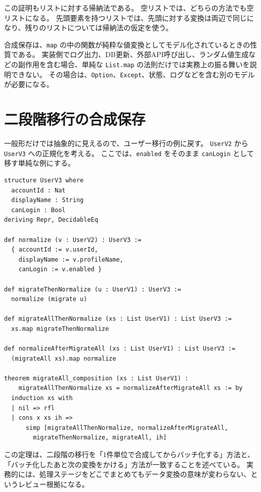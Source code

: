 この証明もリストに対する帰納法である。
空リストでは、どちらの方法でも空リストになる。
先頭要素を持つリストでは、先頭に対する変換は両辺で同じになり、残りのリストについては帰納法の仮定を使う。

\begin{warningbox}
合成保存は、\texttt{map} の中の関数が純粋な値変換としてモデル化されているときの性質である。
実装側でログ出力、DB更新、外部API呼び出し、ランダム値生成などの副作用を含む場合、単純な \texttt{List.map} の法則だけでは実務上の振る舞いを説明できない。
その場合は、\texttt{Option}、\texttt{Except}、状態、ログなどを含む別のモデルが必要になる。
\end{warningbox}

\section{二段階移行の合成保存}

一般形だけでは抽象的に見えるので、ユーザー移行の例に戻す。
\texttt{UserV2} から \texttt{UserV3} への正規化を考える。
ここでは、\texttt{enabled} をそのまま \texttt{canLogin} として移す単純な例にする。

\begin{listing}[htbp]
\begin{verbatim}
structure UserV3 where
  accountId : Nat
  displayName : String
  canLogin : Bool
deriving Repr, DecidableEq

def normalize (v : UserV2) : UserV3 :=
  { accountId := v.userId,
    displayName := v.profileName,
    canLogin := v.enabled }

def migrateThenNormalize (u : UserV1) : UserV3 :=
  normalize (migrate u)

def migrateAllThenNormalize (xs : List UserV1) : List UserV3 :=
  xs.map migrateThenNormalize

def normalizeAfterMigrateAll (xs : List UserV1) : List UserV3 :=
  (migrateAll xs).map normalize

theorem migrateAll_composition (xs : List UserV1) :
    migrateAllThenNormalize xs = normalizeAfterMigrateAll xs := by
  induction xs with
  | nil => rfl
  | cons x xs ih =>
      simp [migrateAllThenNormalize, normalizeAfterMigrateAll,
        migrateThenNormalize, migrateAll, ih]
\end{verbatim}
\caption{二段階移行をリスト全体へ持ち上げる}
\label{lst:ch24-two-step-migration}
\end{listing}

この定理は、二段階の移行を「1件単位で合成してからバッチ化する」方法と、「バッチ化したあと次の変換をかける」方法が一致することを述べている。
実務的には、処理ステージをどこでまとめてもデータ変換の意味が変わらない、というレビュー根拠になる。

